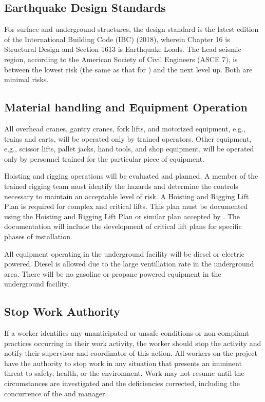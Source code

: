 \subsection{Earthquake Design Standards}

For surface and underground structures, the design standard is the
latest edition of the International Building Code (IBC) (2018), wherein
Chapter 16  is Structural Design and Section 1613 is Earthquake
Loads. The Lead seismic region, according to the American Society of
Civil Engineers (ASCE 7), is between the lowest risk (the same as that 
for \fnal) and the next level up. Both are minimal risks.

\subsection{Material handling and Equipment Operation}

All overhead cranes, gantry cranes, fork lifts, and motorized equipment,
e.g., trains and carts, will be operated only by trained
operators. Other equipment, e.g., scissor lifts, pallet jacks, hand
tools, and shop equipment, will be operated only by personnel trained
for the particular piece of equipment. 

Hoisting and rigging operations will be evaluated and planned.  A
member of the trained rigging team must identify the hazards and
determine the controls necessary to maintain an acceptable level of
risk.  A Hoisting and Rigging Lift Plan is required for complex and
critical lifts. This plan must be documented using the \fnal Hoisting
and Rigging Lift Plan or similar plan accepted by \fnal. The 
 documentation will include the development of critical lift
plans for specific phases of installation. %

All equipment operating in the underground facility will be diesel or
electric powered. Diesel is allowed due to the large
ventillation rate in the underground area.  There will be no gasoline or propane powered
equipment in the underground facility.

\subsection{Stop Work Authority}

If a worker identifies any unanticipated or unsafe conditions %
or non-compliant
practices occurring in their work activity, %
the worker %
should  %
stop the activity and notify their supervisor and   coordinator of
this action. All workers on the  project have the
authority to stop work in any situation that presents an imminent
threat to safety, health, or the environment. Work may not resume
until the circumstances are investigated and the deficiencies corrected,
including the concurrence of the  
and   manager.

